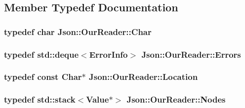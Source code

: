 \subsection{Member Typedef Documentation}
\subsubsection[{\texorpdfstring{Char}{Char}}]{\setlength{\rightskip}{0pt plus 5cm}typedef char {\bf Json\+::\+Our\+Reader\+::\+Char}}\hypertarget{classJson_1_1OurReader_a0cd0bab4caa66594ab843ccd5f9dc239}{}\label{classJson_1_1OurReader_a0cd0bab4caa66594ab843ccd5f9dc239}
\subsubsection[{\texorpdfstring{Errors}{Errors}}]{\setlength{\rightskip}{0pt plus 5cm}typedef std\+::deque$<${\bf Error\+Info}$>$ {\bf Json\+::\+Our\+Reader\+::\+Errors}\hspace{0.3cm}{\ttfamily [private]}}\hypertarget{classJson_1_1OurReader_a8cc69593ef7303e58e99bb5dbb767562}{}\label{classJson_1_1OurReader_a8cc69593ef7303e58e99bb5dbb767562}
\subsubsection[{\texorpdfstring{Location}{Location}}]{\setlength{\rightskip}{0pt plus 5cm}typedef const {\bf Char}$\ast$ {\bf Json\+::\+Our\+Reader\+::\+Location}}\hypertarget{classJson_1_1OurReader_a1bdc7bbc52ba87cae6b19746f2ee0189}{}\label{classJson_1_1OurReader_a1bdc7bbc52ba87cae6b19746f2ee0189}
\subsubsection[{\texorpdfstring{Nodes}{Nodes}}]{\setlength{\rightskip}{0pt plus 5cm}typedef std\+::stack$<${\bf Value}$\ast$$>$ {\bf Json\+::\+Our\+Reader\+::\+Nodes}\hspace{0.3cm}{\ttfamily [private]}}\hypertarget{classJson_1_1OurReader_a8480a5ef159cee3a090f96358414d8d3}{}\label{classJson_1_1OurReader_a8480a5ef159cee3a090f96358414d8d3}


